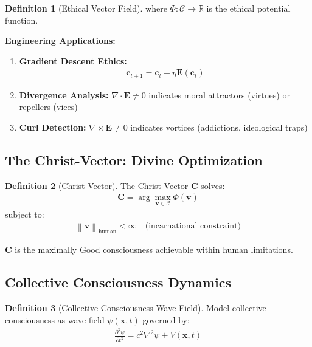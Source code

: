 \documentclass[11pt,a4paper]{article}
\theoremstyle{definition}
\newtheorem{definition}{Definition}[section]
\theoremstyle{remark}
\newcommand{\RR}{\mathbb{R}}
\newcommand{\CC}{\mathcal{C}}
\newcommand{\EE}{\mathbf{E}}
\newcommand{\cc}{\mathbf{c}}
\newcommand{\norm}[1]{\left\|#1\right\|}
\begin{document}
\begin{small}
\begin{definition}[Ethical Vector Field]
where $\Phi: \CC \to \RR$ is the ethical potential function.
\end{definition}

\textbf{Engineering Applications:}

\begin{enumerate}
\item \textbf{Gradient Descent Ethics:}
\begin{align}
\cc_{t+1} = \cc_t + \eta \EE(\cc_t)
\end{align}

\item \textbf{Divergence Analysis:} $\nabla \cdot \EE \neq 0$ indicates moral attractors (virtues) or repellers (vices)

\item \textbf{Curl Detection:} $\nabla \times \EE \neq 0$ indicates vortices (addictions, ideological traps)
\end{enumerate}

\subsection{The Christ-Vector: Divine Optimization}

\begin{definition}[Christ-Vector]
The Christ-Vector $\mathbf{C}$ solves:
\begin{align}
\mathbf{C} = \arg\max_{\mathbf{v} \in \CC} \Phi(\mathbf{v})
\end{align}
subject to:
\begin{align}
\norm{\mathbf{v}}_{\text{human}} < \infty \quad \text{(incarnational constraint)}
\end{align}

$\mathbf{C}$ is the maximally Good consciousness achievable within human limitations.
\end{definition}

\subsection{Collective Consciousness Dynamics}

\begin{definition}[Collective Consciousness Wave Field]
Model collective consciousness as wave field $\psi(\mathbf{x}, t)$ governed by:
\begin{align}
\frac{\partial^2 \psi}{\partial t^2} = c^2 \nabla^2 \psi + V(\mathbf{x}, t)
\end{align}


\end{definition}
\end{small}
\end{document}
